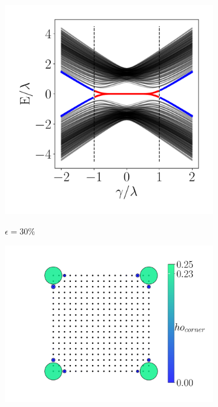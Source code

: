 \begin{figure}[h!]
     \begin{minipage}[h!]{0.7\textwidth}
         \begin{subfigure}[b!]{0.44 \textwidth}
             \caption{$\epsilon = 30\%$}
             \includegraphics[width=\textwidth]{Imagenes/Resultados_Hoti_Cuadrado/bands_square_shh_0.3.pdf}
             \label{}
         \end{subfigure}\hspace*{-0.5em}
         \begin{subfigure}[b!]{0.56 \textwidth}
             \caption*{}
             \includegraphics[width=\textwidth]{Imagenes/Resultados_Hoti_Cuadrado/proyection_square_0.3.pdf}
             \label{}
         \end{subfigure}\hspace*{-0.5em}
     \end{minipage}\vspace*{-2.5em}
     

\end{figure}
